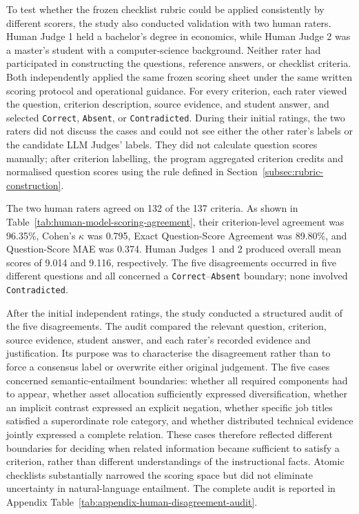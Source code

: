 To test whether the frozen checklist rubric could be applied consistently by different scorers, the study also conducted validation with two human raters. Human Judge 1 held a bachelor's degree in economics, while Human Judge 2 was a master's student with a computer-science background. Neither rater had participated in constructing the questions, reference answers, or checklist criteria. Both independently applied the same frozen scoring sheet under the same written scoring protocol and operational guidance. For every criterion, each rater viewed the question, criterion description, source evidence, and student answer, and selected \texttt{Correct}, \texttt{Absent}, or \texttt{Contradicted}. During their initial ratings, the two raters did not discuss the cases and could not see either the other rater's labels or the candidate LLM Judges' labels. They did not calculate question scores manually; after criterion labelling, the program aggregated criterion credits and normalised question scores using the rule defined in Section~\ref{subsec:rubric-construction}.

The two human raters agreed on 132 of the 137 criteria. As shown in Table~\ref{tab:human-model-scoring-agreement}, their criterion-level agreement was 96.35\%, Cohen's $\kappa$ was 0.795, Exact Question-Score Agreement was 89.80\%, and Question-Score MAE was 0.374. Human Judges 1 and 2 produced overall mean scores of 9.014 and 9.116, respectively. The five disagreements occurred in five different questions and all concerned a \texttt{Correct}--\texttt{Absent} boundary; none involved \texttt{Contradicted}.

After the initial independent ratings, the study conducted a structured audit of the five disagreements. The audit compared the relevant question, criterion, source evidence, student answer, and each rater's recorded evidence and justification. Its purpose was to characterise the disagreement rather than to force a consensus label or overwrite either original judgement. The five cases concerned semantic-entailment boundaries: whether all required components had to appear, whether asset allocation sufficiently expressed diversification, whether an implicit contrast expressed an explicit negation, whether specific job titles satisfied a superordinate role category, and whether distributed technical evidence jointly expressed a complete relation. These cases therefore reflected different boundaries for deciding when related information became sufficient to satisfy a criterion, rather than different understandings of the instructional facts. Atomic checklists substantially narrowed the scoring space but did not eliminate uncertainty in natural-language entailment. The complete audit is reported in Appendix Table~\ref{tab:appendix-human-disagreement-audit}.

